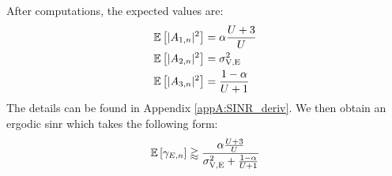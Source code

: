 After computations, the expected values are:
\begin{equation}
    \begin{split}
        &\mathbb{E} \left[|A_{1,n}|^2\right] = \alpha \frac{U+3}{U} \\
        &\mathbb{E} \left[|A_{2,n}|^2\right] = \sigma^2_{\text{V,E}}\\
        &\mathbb{E} \left[|A_{3,n}|^2\right] = \frac{1-\alpha}{U+1}
    \end{split}
    \label{eq:expected_eve_filt1}
\end{equation}
The details can be found in Appendix  \ref{appA:SINR_deriv}. We then obtain an ergodic \gls{sinr} which takes the following form:
\begin{equation}
    \mathbb{E} \left[\gamma_{E,n}\right] \gtrapprox \frac{\alpha \frac{U+3}{U}}{\sigma^2_{\text{V,E}} + \frac{1-\alpha}{U+1}}
    \label{eq:sinr_eve_filt1}
\end{equation}

